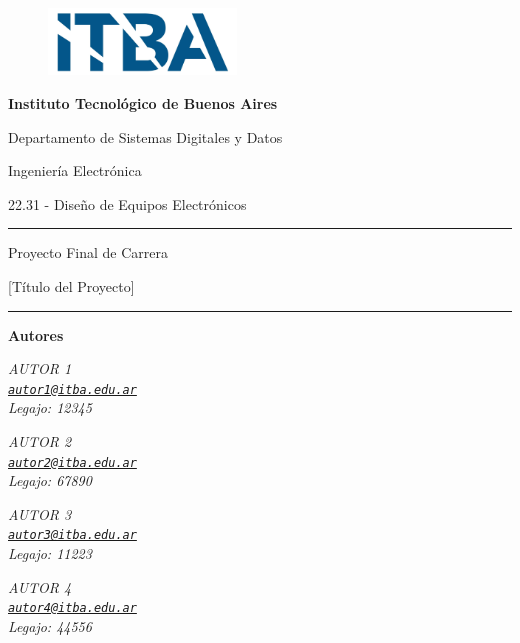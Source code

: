 \documentclass[../../main.tex]{subfiles}
\begin{document}
\begin{titlepage}
    \centering
    \begin{figure}[t]
        \centering
        \includegraphics[width=5cm]{itba_logo.jpg}
    \end{figure}    
    {\bfseries\Large{Instituto Tecnológico de Buenos Aires}\par}
    \vskip 0.5cm
    {\Large{Departamento de Sistemas Digitales y Datos}\par}
    \vskip 0.3cm
    {\Large{Ingeniería Electrónica}\par}
    \vskip 0.6cm
    {\LARGE{22.31 - Diseño de Equipos Electrónicos}\par}
    \vskip 0.75cm
    \rule{\textwidth}{0.5pt}
    \vskip 0.5cm
    {\Large{Proyecto Final de Carrera}\par}
    \vskip 0.35cm
    {\bfseries\LARGE{[Título del Proyecto]\par}} %
    \vskip 0.5cm
    \rule{\textwidth}{0.5pt}
    
    \vskip 1cm   
    {\bfseries\Large{Autores}\par}
    \vskip 1cm 
    \begin{center}
    \begin{minipage}[b]{0.4\textwidth}
    \centering \slshape
    AUTOR 1\\[0.3ex]
    \href{mailto:autor1@itba.edu.ar}{\texttt{autor1@itba.edu.ar}}\\[0.3ex]
    Legajo: 12345
    \end{minipage}
    \begin{minipage}[b]{0.4\textwidth}
    \centering \slshape
    AUTOR 2\\[0.3ex]
    \href{mailto:autor2@itba.edu.ar}{\texttt{autor2@itba.edu.ar}}\\[0.3ex]
    Legajo: 67890
    \end{minipage}
    \vskip 1cm
    \begin{minipage}[b]{0.4\textwidth}
    \centering \slshape
    AUTOR 3\\[0.3ex]
    \href{mailto:autor3@itba.edu.ar}{\texttt{autor3@itba.edu.ar}}\\[0.3ex]
    Legajo: 11223
    \end{minipage} 
    \begin{minipage}[b]{0.4\textwidth}
    \centering \slshape
    AUTOR 4\\[0.3ex]
    \href{mailto:autor4@itba.edu.ar}{\texttt{autor4@itba.edu.ar}}\\[0.3ex]
    Legajo: 44556
    \end{minipage}
    \end{center}
    

\end{titlepage}
\end{document}
